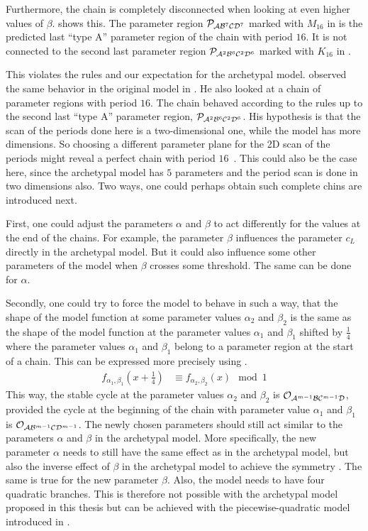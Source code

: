 Furthermore, the chain is completely disconnected when looking at even higher values of $\beta$.
 shows this.
The parameter region $\mathcal{P}_{\mathcal{A}\mathcal{B}^7\mathcal{C}\mathcal{D}^7}$ marked with $M_{16}$ in  is the predicted last ``type A'' parameter region of the chain with period $16$.
It is not connected to the second last parameter region $\mathcal{P}_{\mathcal{A}^2\mathcal{B}^6\mathcal{C}^2\mathcal{D}^6}$ marked with $K_{16}$ in .

This violates the rules and our expectation for the archetypal model.
 observed the same behavior in the original model in \cite{akyuz2022}.
He also looked at a chain of parameter regions with period $16$.
The chain behaved according to the rules up to the second last ``type A'' parameter region, $\mathcal{P}_{\mathcal{A}^2\mathcal{B}^6\mathcal{C}^2\mathcal{D}^6}$.
His hypothesis is that the scan of the periods done here is a two-dimensional one, while the model has more dimensions.
So choosing a different parameter plane for the 2D scan of the periods might reveal a perfect chain with period $16$~\cite{akyuz2022}.
This could also be the case here, since the archetypal model has $5$ parameters and the period scan is done in two dimensions also.
Two ways, one could perhaps obtain such complete chins are introduced next.

First, one could adjust the parameters $\alpha$ and $\beta$ to act differently for the values at the end of the chains.
For example, the parameter $\beta$ influences the parameter $c_L$ directly in the archetypal model.
But it could also influence some other parameters of the model when $\beta$ crosses some threshold.
The same can be done for $\alpha$.

Secondly, one could try to force the model to behave in such a way, that the shape of the model function at some parameter values $\alpha_2$ and $\beta_2$ is the same as the shape of the model function at the parameter values $\alpha_1$ and $\beta_1$ shifted by $\frac{1}{4}$ where the parameter values $\alpha_1$ and $\beta_1$ belong to a parameter region at the start of a chain.
This can be expressed more precisely using .
\begin{align}
	f_{\alpha_1, \beta_1}\left(x + \frac{1}{4}\right) & \equiv f_{\alpha_2, \beta_2}(x) \mod 1
	\label{equ:arch.dyn.shift}
\end{align}
This way, the stable cycle at the parameter values $\alpha_2$ and $\beta_2$ is $\mathcal{O}_{\mathcal{A}^{m-1}\mathcal{B}\mathcal{C}^{m-1}\mathcal{D}}$, provided the cycle at the beginning of the chain with parameter value $\alpha_1$ and $\beta_1$ is $\mathcal{O}_{\mathcal{A}\mathcal{B}^{m-1}\mathcal{C}\mathcal{D}^{m-1}}$.
The newly chosen parameters should still act similar to the parameters $\alpha$ and $\beta$ in the archetypal model.
More specifically, the new parameter $\alpha$ needs to still have the same effect as in the archetypal model, but also the inverse effect of $\beta$ in the archetypal model to achieve the symmetry .
The same is true for the new parameter $\beta$.
Also, the model needs to have four quadratic branches.
This is therefore not possible with the archetypal model proposed in this thesis but can be achieved with the piecewise-quadratic model introduced in .
